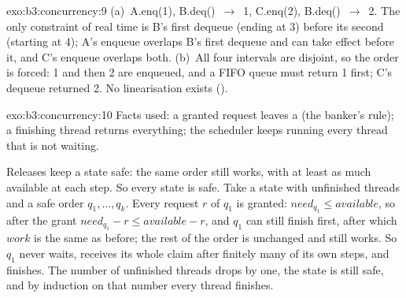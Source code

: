 \begin{solution}{exo:b3:concurrency:9}
(a)~A.enq(1), B.deq()~$\to$~1, C.enq(2), B.deq()~$\to$~2. The only constraint of real time is B's first dequeue (ending at 3) before its second (starting at 4); A's enqueue overlaps B's first dequeue and can take effect before it, and C's enqueue overlaps both. (b)~All four intervals are disjoint, so the order is forced: 1 and then 2 are enqueued, and a FIFO queue must return 1 first; C's dequeue returned 2. No linearisation exists ().
\end{solution}

\begin{solution}{exo:b3:concurrency:10}
Facts used: a granted request leaves a  (the banker's rule); a finishing thread returns everything; the scheduler keeps running every thread that is not waiting.

Releases keep a state safe: the same order still works, with at least as much available at each step. So every state is safe. Take a state with unfinished threads and a safe order $q_1, \dots, q_k$. Every request $r$ of $q_1$ is granted: $\mathit{need}_{q_1} \le \mathit{available}$, so after the grant $\mathit{need}_{q_1} - r \le \mathit{available} - r$, and $q_1$ can still finish first, after which $\mathit{work}$ is the same as before; the rest of the order is unchanged and still works. So $q_1$ never waits, receives its whole claim after finitely many of its own steps, and finishes. The number of unfinished threads drops by one, the state is still safe, and by induction on that number every thread finishes.
\end{solution}

